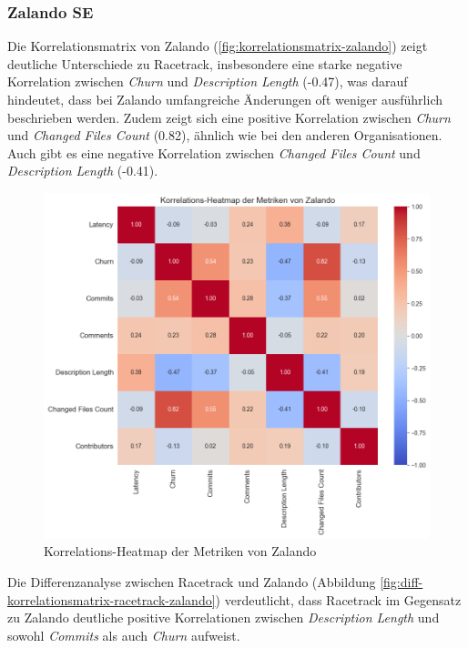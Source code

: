 \newpage

\subsubsection{Zalando SE}
Die Korrelationsmatrix von Zalando (\autoref{fig:korrelationsmatrix-zalando}) zeigt deutliche Unterschiede zu Racetrack, insbesondere eine starke negative Korrelation zwischen \textit{Churn} und \textit{Description Length} (-0.47), was darauf hindeutet, dass bei Zalando umfangreiche Änderungen oft weniger ausführlich beschrieben werden. Zudem zeigt sich eine positive Korrelation zwischen \textit{Churn} und \textit{Changed Files Count} (0.82), ähnlich wie bei den anderen Organisationen. Auch gibt es eine negative Korrelation zwischen \textit{Changed Files Count} und \textit{Description Length} (-0.41).

\begin{figure}[htbp]
    \includegraphics[width=\textwidth]{Figures/zalando-korrelationsmatrix.png}
    \caption{Korrelations-Heatmap der Metriken von Zalando}
    \label{fig:korrelationsmatrix-zalando}
\end{figure}

Die Differenzanalyse zwischen Racetrack und Zalando (Abbildung \autoref{fig:diff-korrelationsmatrix-racetrack-zalando}) verdeutlicht, dass Racetrack im Gegensatz zu Zalando deutliche positive Korrelationen zwischen \textit{Description Length} und sowohl \textit{Commits} als auch \textit{Churn} aufweist.

